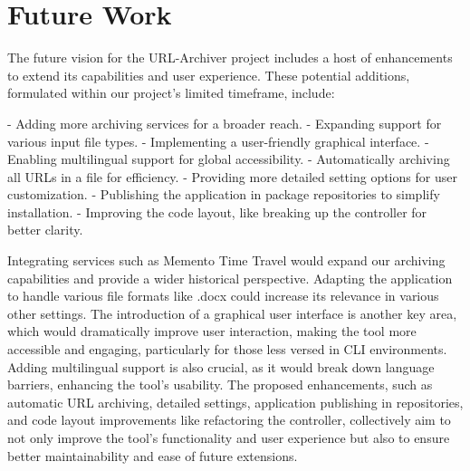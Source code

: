 \section{Future Work}
The future vision for the URL-Archiver project includes a host of enhancements to extend its capabilities and user experience.
These potential additions, formulated within our project's limited timeframe, include:

- Adding more archiving services for a broader reach.
- Expanding support for various input file types.
- Implementing a user-friendly graphical interface.
- Enabling multilingual support for global accessibility.
- Automatically archiving all URLs in a file for efficiency.
- Providing more detailed setting options for user customization.
- Publishing the application in package repositories to simplify installation.
- Improving the code layout, like breaking up the controller for better clarity.

Integrating services such as Memento Time Travel would expand our archiving capabilities and provide a wider historical perspective.
Adapting the application to handle various file formats like .docx could increase its relevance in various other settings.
The introduction of a graphical user interface is another key area, which would dramatically improve user interaction, making the tool more accessible and engaging, particularly for those less versed in CLI environments.
Adding multilingual support is also crucial, as it would break down language barriers, enhancing the tool's usability.
The proposed enhancements, such as automatic URL archiving, detailed settings, application publishing in repositories, and code layout improvements like refactoring the controller, collectively aim to not only improve the tool's functionality and user experience but also to ensure better maintainability and ease of future extensions.
